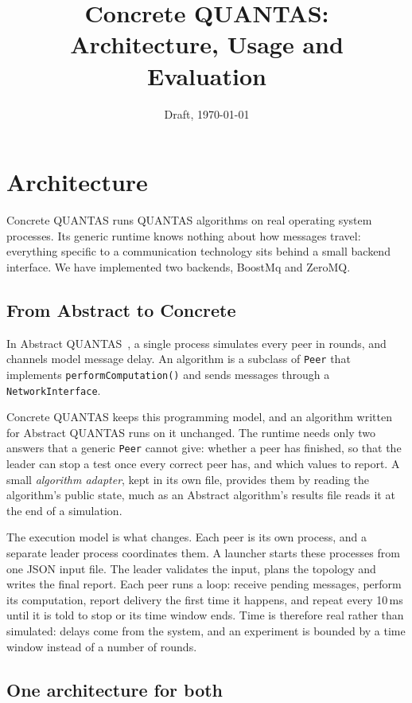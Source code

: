 \documentclass[11pt,a4paper]{article}
\title{Concrete QUANTAS: Architecture, Usage and Evaluation}
\author{}
\date{Draft, \today}
\newcommand{\code}[1]{\texttt{#1}}
\begin{document}
\maketitle

\section{Architecture}

Concrete QUANTAS runs QUANTAS algorithms on real operating system processes. Its generic runtime
knows nothing about how messages travel: everything specific to a communication technology sits
behind a small backend interface. We have implemented two backends, BoostMq and ZeroMQ.

\subsection{From Abstract to Concrete}

In Abstract QUANTAS~\cite{quantas}, a single process simulates every peer in rounds, and channels
model message delay. An algorithm is a subclass of \code{Peer} that implements
\code{performComputation()} and sends messages through a \code{NetworkInterface}.

Concrete QUANTAS keeps this programming model, and an algorithm written for Abstract QUANTAS runs on
it unchanged. The runtime needs only two answers that a generic \code{Peer} cannot give: whether a
peer has finished, so that the leader can stop a test once every correct peer has, and which values
to report. A small \emph{algorithm adapter}, kept in its own file, provides them by reading the
algorithm's public state, much as an Abstract algorithm's results file reads it at the end of a
simulation.

The execution model is what changes. Each peer is its own process, and a separate leader process
coordinates them. A launcher starts these processes from one JSON input file. The leader validates
the input, plans the topology and writes the final report. Each peer runs a loop: receive pending
messages, perform its computation, report delivery the first time it happens, and repeat every
10\,ms until it is told to stop or its time window ends. Time is therefore real rather than
simulated: delays come from the system, and an experiment is bounded by a time window instead of a
number of rounds.

\subsection{One architecture for both}
\end{document}
